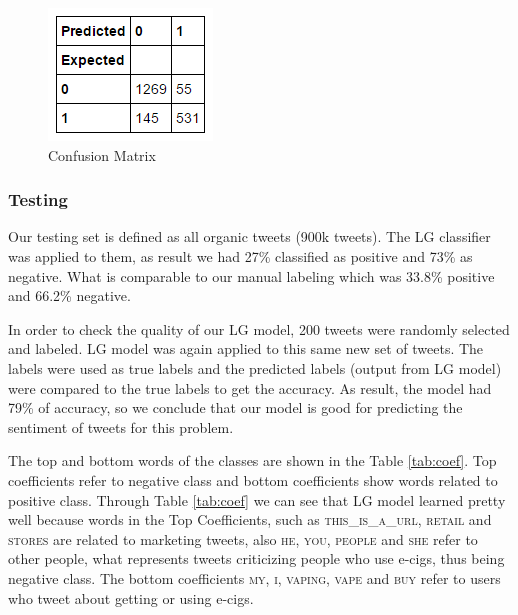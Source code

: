 \documentclass{sig-alternate}
\begin{document}
\begin{figure}[t]
\includegraphics[width=\columnwidth]{matrix.png}
\centering
\caption{Confusion Matrix}
\label{figura:matrix}
\end{figure}

\subsubsection{Testing}
\label{sec:test}
Our testing set is defined as all organic tweets (900k tweets). The LG classifier was applied to them, as result we had 27\% classified as positive and 73\% as negative. What is comparable to our manual labeling which was 33.8\% positive and 66.2\% negative. 

In order to check the quality of our LG model, 200 tweets were randomly selected and labeled. LG model was again applied to this same new set of tweets. The labels were used as true labels and the predicted labels (output from LG model) were compared to the true labels to get the accuracy. As result, the model had 79\% of accuracy, so we conclude that our model is good for predicting the sentiment of tweets for this problem.

The top and bottom words of the classes are shown in the Table \ref{tab:coef}. Top coefficients refer to negative class and bottom coefficients show words related to positive class. Through Table \ref{tab:coef} we can see that LG model learned pretty well because words in the Top Coefficients, such as \textsc{this\_is\_a\_url}, \textsc{retail} and \textsc{stores} are related to marketing tweets, also \textsc{he}, \textsc{you}, \textsc{people} and \textsc{she} refer to other people, what represents tweets criticizing people who use e-cigs, thus being negative class. The bottom coefficients \textsc{my}, \textsc{i}, \textsc{vaping}, \textsc{vape} and \textsc{buy} refer to users who tweet about getting or using e-cigs.
\end{document}
